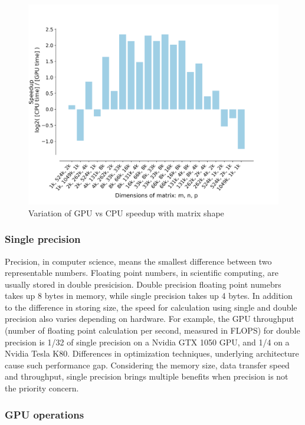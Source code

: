 \documentclass[9pt,twocolumn,twoside,lineno]{gsag3jnl}
\begin{document}
\begin{figure}[!htb]
	\centering
	\caption{Variation of GPU vs CPU speedup with matrix shape
	}
	\label{GPUCPUShape}
	\includegraphics[scale = 0.36]{figs/speedup.png}
\end{figure} 

 
\subsubsection{Single precision}
Precision, in computer science, means the smallest difference between two representable numbers.
Floating point numbers, in scientific computing, are usually stored in double presicision. 
Double precision floating point numebrs takes up 8 bytes in memory, while single precision takes up 4 bytes. 
In addition to the difference in storing size, the speed for calculation using single and double precision also varies depending on hardware. 
For example, the GPU throughput (number of floating point calculation per second, measured in FLOPS) for double precision is 1/32 of single precision on a Nvidia GTX 1050 GPU, and 1/4 on a Nvidia Tesla K80. 
Differences in optimization techniques, underlying architecture cause such performance gap. 
Considering the memory size, data transfer speed and throughput, single precision brings multiple benefits when precision is not the priority concern. 


\subsubsection{GPU operations}
\end{document}
